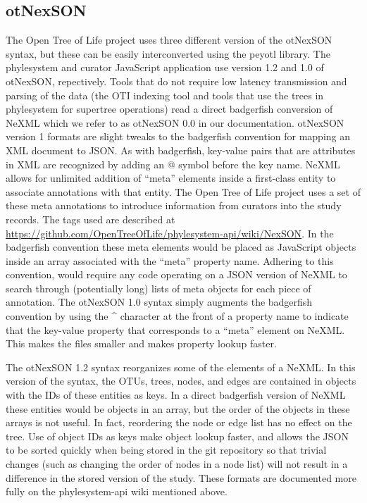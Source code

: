 \documentclass{bioinfo}
\newcommand{\ps}{phylesystem\xspace}
\newcommand{\otol}{Open Tree of Life\xspace}
\newcommand{\nexson}{otNexSON\xspace}
\newcommand{\js}{JavaScript\xspace}
\begin{document}
\begin{methods}
\subsection*{\nexson}
The \otol project uses three different version of the \nexson syntax, but these
    can be easily interconverted using the peyotl library.
The \ps and curator \js application use version 1.2 and 1.0 of \nexson, repectively.
Tools that do not require low latency transmission and parsing of the data (the OTI indexing tool
    and tools that use the trees in \ps for supertree operations)
    read a direct badgerfish \citep{badgerfish} conversion of NeXML which we refer to as \nexson 0.0 in our documentation.
\nexson version 1 formats are slight tweaks to the badgerfish convention \citep{badgerfish} for mapping an XML document to JSON.
As with badgerfish, key-value pairs that are attributes in XML are recognized by adding an @ symbol before the key name.
NeXML allows for unlimited addition of ``meta'' elements inside a first-class entity to associate annotations with that entity.
The \otol project uses a set of these meta annotations to introduce information from curators into the study records.
The tags used are described at \url{https://github.com/OpenTreeOfLife/phylesystem-api/wiki/NexSON}.
In the badgerfish convention these meta elements would be placed as \js objects inside an array associated with the ``meta'' property name.
Adhering to this convention, would require any code operating on a JSON version of NeXML to search through (potentially
    long) lists of meta objects for each piece of annotation.
The \nexson 1.0 syntax simply augments the badgerfish convention by using the \^{} character at the front of a
    property name to indicate that the key-value property that corresponds to a ``meta'' element on NeXML.
This makes the files smaller and makes property lookup faster.

The \nexson 1.2 syntax reorganizes some of the elements of a NeXML.
In this version of the syntax, the OTUs, trees, nodes, and edges are contained in objects with the IDs of these entities as keys.
In a direct badgerfish version of NeXML these entities would be objects in an array, but the order of the objects
    in these arrays is not useful.
In fact, reordering the node or edge list has no effect on the tree.
Use of object IDs as keys make object lookup faster, and allows the JSON to be sorted quickly when being stored in 
    the git repository so that trivial changes (such as changing the order of nodes in a node list) will not result in 
    a difference in the stored version of the study.
These formats are documented more fully on the \ps-api wiki mentioned above.


\end{methods}
\end{document}

